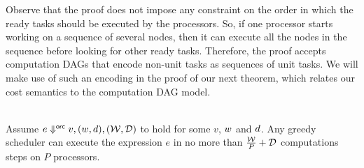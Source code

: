 Observe that the proof does not impose any constraint on the order in
which the ready tasks should be executed by the processors.  So, if one
processor starts working on a sequence of several nodes, then it can
execute all the nodes in the sequence before looking for other ready
tasks.  Therefore, the proof accepts computation DAGs that encode
non-unit tasks as sequences of unit tasks.  We will make use of such
an encoding in the proof of our next theorem, which relates our cost
semantics to the computation DAG model.  


\begin{theorem} 
\label{thm:generalize-brent}
\label{thm:generalized-brent}~\\
Assume 
${ e } \Downarrow^{\textsf{orc}} { v }, ({w},{d}), ({{\mathcal{W}}},{{\mathcal{D}}})$
to hold for some $v$, $w$ and $d$.
Any greedy scheduler can execute the expression $e$
in no more than $\frac{{\mathcal{W}}}{P} + {\mathcal{D}}$ computations steps on $P$ processors. 
\end{theorem}

